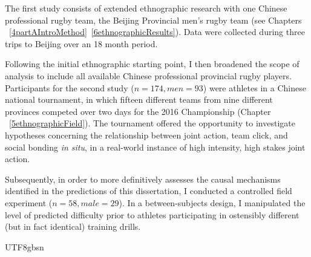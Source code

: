 \begin{CJK}{UTF8}{gbsn}
  The first study consists of extended ethnographic research with one Chinese professional rugby team, the Beijing Provincial men's rugby team (see Chapters ~\ref{4partAIntroMethod}\nobreakdash~\ref{6ethnographicResults}).  Data were collected during three trips to Beijing over an 18 month period.

  Following the initial ethnographic starting point, I then broadened the scope of analysis to include all available Chinese professional provincial rugby players. Participants for the second study ($n = 174, men = 93$) were athletes in a Chinese national tournament, in which fifteen different teams from nine different provinces competed over two days for the 2016 Championship (Chapter ~\ref{5ethnographicField}).  The tournament offered the opportunity to investigate hypotheses concerning the relationship between joint action, team click, and social bonding \textit{in situ}, in a real-world instance of high intensity, high stakes joint action.

  Subsequently, in order to more definitively assesses the causal mechanisms identified in the predictions of this dissertation, I conducted a controlled field experiment ($n = 58, male = 29$). In a between-subjects design, I manipulated the level of predicted difficulty prior to athletes participating in ostensibly different (but in fact identical) training drills.








\end{CJK}{UTF8}{gbsn}

